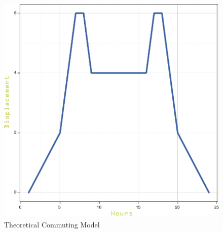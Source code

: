 \begin{figure}[h]
\begin{center}
\includegraphics[scale =0.5] {results/images/common_commuting_model.pdf}
\caption{Theoretical Commuting Model}
\label{fig:commuting}
\end{center}
\end{figure}

